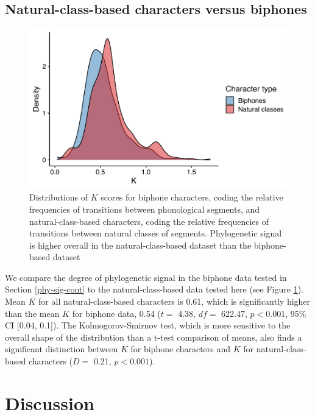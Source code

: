 \hypertarget{classes-vs-biphones}{%
\subsection{Natural-class-based characters versus biphones}\label{classes-vs-biphones}}

\begin{figure}[tbp]

{\centering \includegraphics[width=0.66\linewidth]{05-phylo-signal/fig/k-biphones-classes} 

}

\caption[Distributions of $K$ scores for segmental biphone characters versus natural-class-based characters]{Distributions of $K$ scores for biphone characters, coding the relative frequencies of transitions between phonological segments, and natural-class-based characters, coding the relative frequencies of transitions between natural classes of segments. Phylogenetic signal is higher overall in the natural-class-based dataset than the biphone-based dataset}\label{fig:k-biphones-vs-features}
\end{figure}

We compare the degree of phylogenetic signal in the biphone data tested in Section \ref{phy-sig-cont} to the natural-class-based data tested here (see Figure \ref{fig:k-biphones-vs-features}). Mean \(K\) for all natural-class-based characters is 0.61, which is significantly higher than the mean \(K\) for biphone data, 0.54 (\(t=\) 4.38, \(df=\) 622.47, \(p < 0.001\), 95\% CI {[}0.04, 0.1{]}). The Kolmogorov-Smirnov test, which is more sensitive to the overall shape of the distribution than a t-test comparison of means, also finds a significant distinction between \(K\) for biphone characters and \(K\) for natural-class-based characters (\(D=\) 0.21, \(p < 0.001\)).

\hypertarget{phylo-sig-discussion}{%
\section{Discussion}\label{phylo-sig-discussion}}

